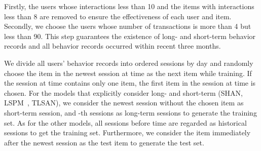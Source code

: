 \documentclass[preprint,12pt]{elsarticle}
\newcommand{\tool}{TLSAN\xspace}
\begin{document}
\begin{sloppypar}
Firstly, the users whose interactions less than 10 and the items with interactions less than 8 are removed to ensure the effectiveness of each user and item.
Secondly, we choose the users whose number of transactions is more than 4 but less than 90. This step guarantees the existence of long- and short-term behavior records and all behavior records occurred within recent three months.
\begin{table}[htbp]
	\caption{Amazon Datasets Statistics (After preprocessing)}
	\centering
	\label{tab:2}
\end{table}

We divide all users' behavior records into ordered sessions by day and randomly choose the item in the newest session at time  as the next item while training. If the session at time  contains only one item, the first item in the session at time  is chosen. For the models that explicitly consider long- and short-term (SHAN, LSPM~\cite{lspm}, \tool), we consider the newest session without the chosen item as short-term session, and -th sessions as long-term sessions to generate the training set. As for the other models, all sessions before time  are regarded as historical sessions to get the  training set. Furthermore, we consider the item immediately after the newest session as the test item to generate the test set. 


\end{sloppypar}
\end{document}
